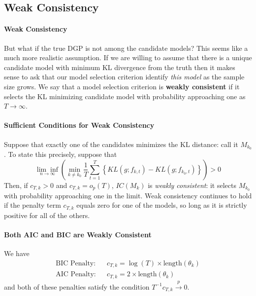 \documentclass[12pt]{article}
\theoremstyle{definition}
\begin{document}
\subsection{Weak Consistency}
\paragraph{Weak Consistency} But what if the true DGP is not among the candidate models? This seems like a much more realistic assumption. If we are willing to assume that there is a unique candidate model with minimum KL divergence from the truth then it makes sense to ask that our model selection criterion identify \emph{this model} as the sample size grows. We say that a model selection criterion is \textbf{weakly consistent} if it selects the KL minimizing candidate model with probability approaching one as $T\rightarrow \infty$.


\paragraph{Sufficient Conditions for Weak Consistency}
Suppose that exactly one of the candidates minimizes the KL distance: call it $M_{k_0}$. To state this precisely, suppose that
	$$\underset{n\rightarrow \infty}{\lim\inf}\left(\underset{k \neq k_0}{\min} \frac{1}{T}\sum_{t = 1}^T \left\{ KL(g; f_{k,t}) - KL(g;f_{k_0,t}) \right\} \right) > 0$$
Then, if $c_{T,k}> 0$ and $c_{T,k} = o_p(T)$, $IC(M_k)$ is \emph{weakly consistent}: it selects $M_{k_0}$ with probability approaching one in the limit. Weak consistency continues to hold if the penalty term $c_{T,k}$ equals zero for one of the models, so long as it is strictly positive for all of the others.

\paragraph{Both AIC and BIC are Weakly Consistent}
We have
	\begin{eqnarray*}
		\mbox{BIC Penalty:}&& c_{T,k} = \log(T) \times \mbox{length}(\theta_k)\\
		\mbox{AIC Penalty:} && c_{T,k} = 2\times \mbox{length}(\theta_k)
	\end{eqnarray*}
and both of these penalties satisfy the condition $T^{-1}c_{T,k} \overset{p}{\rightarrow} 0$.
\end{document}
